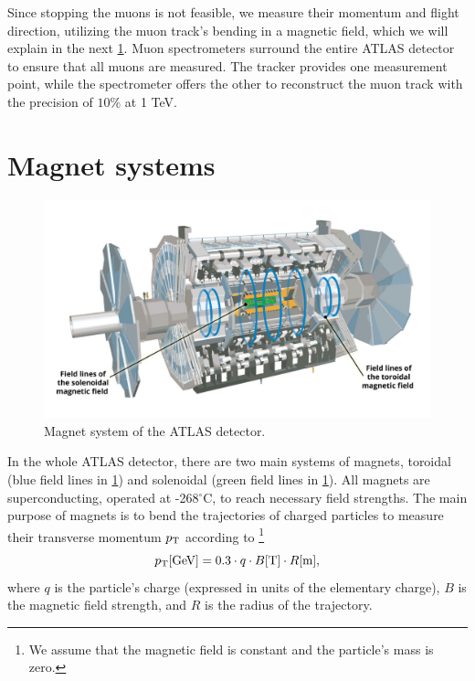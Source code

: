 Since stopping the muons is not feasible, we measure their momentum and flight direction, utilizing the muon track's bending in a magnetic field, which we will explain in the next \cref{sec:magnet}.
Muon spectrometers surround the entire ATLAS detector to ensure that all muons are measured.
The tracker provides one measurement point, while the spectrometer offers the other to reconstruct the muon track with the precision of $10\%$ at 1 TeV.


\section{Magnet systems}
\label{sec:magnet}
\begin{figure}[htb]
    \centering
    \includegraphics[width=1\linewidth]{src/img/magnet.jpg}
    \caption{Magnet system of the ATLAS detector.}
    \label{fig:magnet}
\end{figure}

In the whole ATLAS detector, there are two main systems of magnets, toroidal (blue field lines in \cref{fig:magnet}) and solenoidal (green field lines in \cref{fig:magnet}).
All magnets are superconducting, operated at -268$^\circ$C, to reach necessary field strengths.
The main purpose of magnets is to bend the trajectories of charged particles to measure their transverse momentum $p_\text{T}$ according to \footnote{We assume that the magnetic field is constant and the particle's mass is zero.}
\begin{equation}
    \label{eq:magnet_momentum}
    p_\text{T} [\text{GeV}] = 0.3 \cdot q \cdot B [\text{T}] \cdot R [\text{m}],
\end{equation} 
where $q$ is the particle's charge (expressed in units of the elementary charge), $B$ is the magnetic field strength, and $R$ is the radius of the trajectory.

